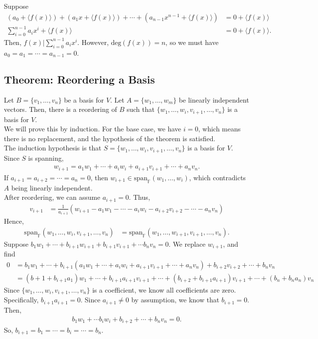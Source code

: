 \documentclass[8pt]{extarticle}
\begin{document}
  Suppose
  \begin{align*}
    (a_0 + \langle f(x)\rangle) + (a_1x + \langle f(x) \rangle) + \cdots + (a_{n-1}x^{n-1} + \langle f(x) \rangle) &= 0 + \langle f(x) \rangle\\
    \sum_{i=0}^{n-1}a_ix^i + \langle f(x) \rangle &= 0 + \langle f(x) \rangle.
  \end{align*}
  Then, $f(x) | \sum_{i=0}^{n-1} a_ix^{i}$. However, $\text{deg}(f(x)) = n$, so we must have $a_0 = a_1 = \cdots = a_{n-1} = 0$.
  \subsection{Theorem: Reordering a Basis}%
  Let $B = \{v_1,\dots,v_n\}$ be a basis for $V$. Let $A = \{w_1,\dots,w_m\}$ be linearly independent vectors. Then, there is a reordering of $B$ such that $\{w_1,\dots,w_i,v_{i+1},\dots,v_n\}$ is a basis for $V$.\\

  We will prove this by induction. For the base case, we have $i=0$, which means there is no replacement, and the hypothesis of the theorem is satisfied.\\

  The induction hypothesis is that $S = \{w_1,\dots,w_i,v_{i+1},\dots,v_n\}$ is a basis for $V$. Since $S$ is spanning,
  \begin{align*}
    w_{i+1} = a_1w_1 + \cdots + a_iw_i + a_{i+1}v_{i+1} + \cdots + a_{n}v_n.
  \end{align*}
  If $a_{i+1} = a_{i+2} = \cdots = a_n = 0$, then $w_{i+1} \in \text{span}_{\mathbb{F}}(w_1,\dots,w_i)$, which contradicts $A$ being linearly independent.\\

  After reordering, we can assume $a_{i+1} = 0$. Thus,
  \begin{align*}
    v_{i+1} &= \frac{1}{a_{i+1}}\left(w_{i+1} - a_1w_1 - \cdots - a_iw_i - a_{i+2}v_{i+2} - \cdots - a_nv_n\right) \tag*{(\textasteriskcentered)}
  \end{align*}
  Hence,
  \begin{align*}
    \text{span}_{\mathbb{F}}\left(w_1,\dots,w_i,v_{i+1},\dots,v_n\right) &= \text{span}_{\mathbb{F}}\left(w_1,\dots,w_{i+1},v_{i+1},\dots,v_n\right).
  \end{align*}
  Suppose $b_1w_1 + \cdots + b_{i+1}w_{i+1} + b_{i+1}v_{i+1} + \cdots b_nv_n  = 0$. We replace $w_{i+1}$, and find
  \begin{align*}
    0 &= b_1w_1 + \cdots + b_{i+1}\left(a_1w_1 + \cdots + a_iw_i + a_{i+1}v_{i+1} + \cdots + a_nv_n\right) + b_{i+2}v_{i+2} + \cdots + b_nv_n\\
      &= (b+1 + b_{i+1}a_1)w_1 + \cdots + b_{i+1}a_{i+1}v_{i+1} + \cdots + (b_{i+2} + b_{i+1}a_{i+1})v_{i+1} + \cdots + (b_n + b_na_n)v_n
  \end{align*}
  Since $\{w_1,\dots,w_i,v_{i+1},\dots,v_n\}$ is a coefficient, we know all coefficients are zero. Specifically, $b_{i+1}a_{i+1} = 0$. Since $a_{i+1} \neq 0$ by assumption, we know that $b_{i+1} = 0$. Then,
  \begin{align*}
    b_{1}w_1 + \cdots b_iw_i + b_{i+2} + \cdots + b_{n}v_n = 0.
  \end{align*}
  So, $b_{i+1} = b_1 = \cdots = b_i = \cdots = b_n$.
\end{document}
